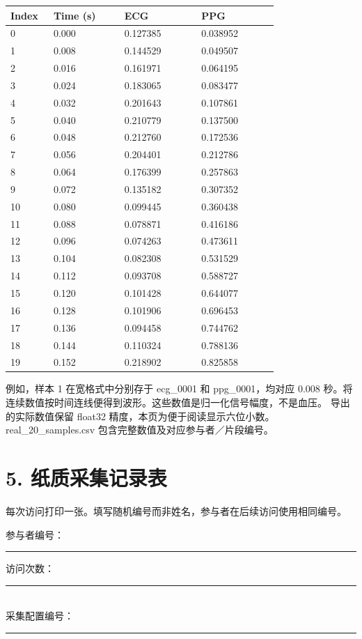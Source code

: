 \documentclass[11pt,letterpaper]{article}
\renewcommand{\arraystretch}{1.22}
\begin{document}
\par\smallskip
\begin{tabular}{@{}p{0.14\linewidth}p{0.23\linewidth}p{0.25\linewidth}p{0.25\linewidth}@{}}\toprule
Index & Time (s) & ECG & PPG\\\midrule
0 & 0.000 & 0.127385 & 0.038952\\
1 & 0.008 & 0.144529 & 0.049507\\
2 & 0.016 & 0.161971 & 0.064195\\
3 & 0.024 & 0.183065 & 0.083477\\
4 & 0.032 & 0.201643 & 0.107861\\
5 & 0.040 & 0.210779 & 0.137500\\
6 & 0.048 & 0.212760 & 0.172536\\
7 & 0.056 & 0.204401 & 0.212786\\
8 & 0.064 & 0.176399 & 0.257863\\
9 & 0.072 & 0.135182 & 0.307352\\
10 & 0.080 & 0.099445 & 0.360438\\
11 & 0.088 & 0.078871 & 0.416186\\
12 & 0.096 & 0.074263 & 0.473611\\
13 & 0.104 & 0.082308 & 0.531529\\
14 & 0.112 & 0.093708 & 0.588727\\
15 & 0.120 & 0.101428 & 0.644077\\
16 & 0.128 & 0.101906 & 0.696453\\
17 & 0.136 & 0.094458 & 0.744762\\
18 & 0.144 & 0.110324 & 0.788136\\
19 & 0.152 & 0.218902 & 0.825858\\
\bottomrule\end{tabular}\par\smallskip

例如，样本 1 在宽格式中分别存于 ecg\_0001 和 ppg\_0001，均对应 0.008 秒。将连续数值按时间连线便得到波形。这些数值是归一化信号幅度，不是血压。
导出的实际数值保留 float32 精度，本页为便于阅读显示六位小数。real\_20\_samples.csv 包含完整数值及对应参与者／片段编号。\newpage
\section*{5. 纸质采集记录表}
每次访问打印一张。填写随机编号而非姓名，参与者在后续访问使用相同编号。
\par
参与者编号：\rule{4cm}{0.4pt} \quad 访问次数：\rule{1.5cm}{0.4pt}\\
采集配置编号：\rule{7cm}{0.4pt}
\vspace{8pt}
\renewcommand{\arraystretch}{2.7}
\end{document}
